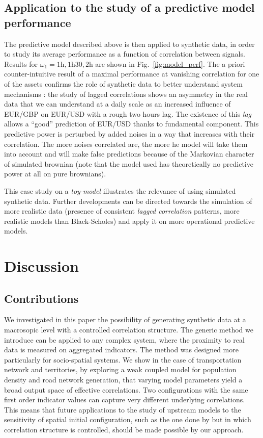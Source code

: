 \documentclass{bmcart}
\begin{document}
\subsection*{Application to the study of a predictive model performance}


The predictive model described above is then applied to synthetic data, in order to study its average performance as a function of correlation between signals. Results for $\omega_1 = 1\textrm{h},1\textrm{h}30,2\textrm{h}$ are shown in Fig.~\ref{fig:model_perf}. The a priori counter-intuitive result of a maximal performance at vanishing correlation for one of the assets confirms the role of synthetic data to better understand system mechanisms : the study of lagged correlations shows an asymmetry in the real data that we can understand at a daily scale as an increased influence of EUR/GBP on EUR/USD with a rough two hours lag. The existence of this \emph{lag} allows a ``good'' prediction of EUR/USD thanks to fundamental component. This predictive power is perturbed by added noises in a way that increases with their correlation. The more noises correlated are, the more he model will take them into account and will make false predictions because of the Markovian character of simulated brownian (note that the model used has theoretically no predictive power at all on pure brownians).


This case study on a \emph{toy-model} illustrates the relevance of using simulated synthetic data. Further developments can be directed towards the simulation of more realistic data (presence of consistent \emph{lagged correlation} patterns, more realistic models than Black-Scholes) and apply it on more operational predictive models.






\section*{Discussion}


\subsection*{Contributions}

We investigated in this paper the possibility of generating synthetic data at a macrosopic level with a controlled correlation structure. The generic method we introduce can be applied to any complex system, where the proximity to real data is measured on aggregated indicators. The method was designed more particularly for socio-spatial systems. We show in the case of transportation network and territories, by exploring a weak coupled model for population density and road network generation, that varying model parameters yield a broad output space of effective correlations. Two configurations with the same first order indicator values can capture very different underlying correlations. This means that future applications to the study of upstream models to the sensitivity of spatial initial configuration, such as the one done by \cite{raimbault2018space} but in which correlation structure is controlled, should be made possible by our approach.
\end{document}

